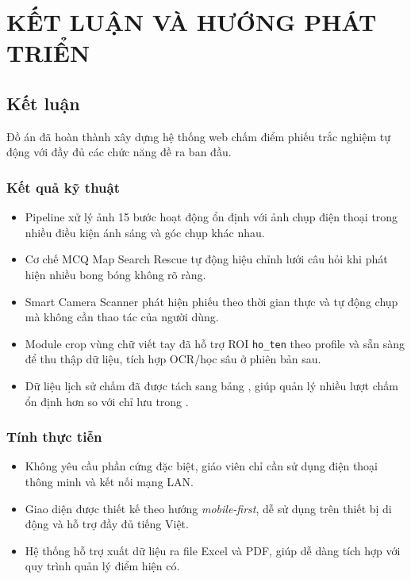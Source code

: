 \chapter{KẾT LUẬN VÀ HƯỚNG PHÁT TRIỂN}

\section{Kết luận}

Đồ án đã hoàn thành xây dựng hệ thống web chấm điểm phiếu trắc nghiệm tự động với đầy đủ các chức năng đề ra ban đầu.

\subsection{Kết quả kỹ thuật}

\begin{itemize}
    \item Pipeline xử lý ảnh 15 bước hoạt động ổn định với ảnh chụp điện thoại trong nhiều điều kiện ánh sáng và góc chụp khác nhau.
    \item Cơ chế MCQ Map Search Rescue tự động hiệu chỉnh lưới câu hỏi khi phát hiện nhiều bong bóng không rõ ràng.
    \item Smart Camera Scanner phát hiện phiếu theo thời gian thực và tự động chụp mà không cần thao tác của người dùng.
    \item Module crop vùng chữ viết tay đã hỗ trợ ROI \texttt{ho\_ten} theo profile và sẵn sàng để thu thập dữ liệu, tích hợp OCR/học sâu ở phiên bản sau.
    \item Dữ liệu lịch sử chấm đã được tách sang bảng , giúp quản lý nhiều lượt chấm ổn định hơn so với chỉ lưu trong .
\end{itemize}

\subsection{Tính thực tiễn}

\begin{itemize}
    \item Không yêu cầu phần cứng đặc biệt, giáo viên chỉ cần sử dụng điện thoại thông minh và kết nối mạng LAN.
    \item Giao diện được thiết kế theo hướng \textit{mobile-first}, dễ sử dụng trên thiết bị di động và hỗ trợ đầy đủ tiếng Việt.
    \item Hệ thống hỗ trợ xuất dữ liệu ra file Excel và PDF, giúp dễ dàng tích hợp với quy trình quản lý điểm hiện có.
\end{itemize}

